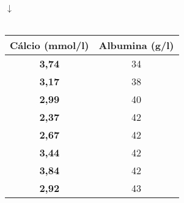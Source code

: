 \documentclass[12pt,a4paper]{article}
\begin{document}
	\vspace{0.1cm}
	\hspace{3.5cm}
	$\downarrow$\\
	\vspace{0.1cm}\\
	\begin{tabular}{|c|c|}\hline
		\textbf{Cálcio (mmol/l)} & \textbf{Albumina (g/l)}\\ \hline
		\textbf{3,74} & 34\\ \hline
		\textbf{3,17} & 38\\ \hline
		\textbf{2,99} & 40\\ \hline
		\textbf{2,37} & 42\\ \hline
		\textbf{2,67} & 42\\ \hline
		\textbf{3,44} & 42\\ \hline
		\textbf{3,84} & 42\\ \hline
		\textbf{2,92} & 43\\ \hline
	\end{tabular}
\end{document}
